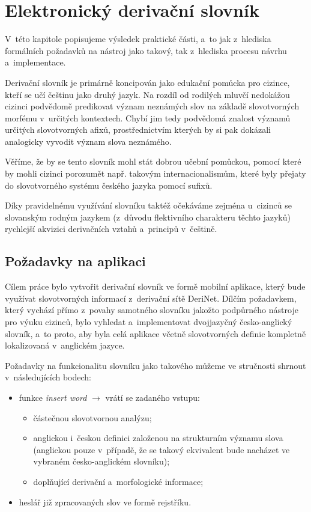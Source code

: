 \hypertarget{elektronickuxfd-derivaux10dnuxed-slovnuxedk}{%
\chapter{Elektronický derivační
slovník}\label{elektronickuxfd-derivaux10dnuxed-slovnuxedk}}

V~této kapitole popisujeme výsledek praktické části, a~to jak z~hlediska
formálních požadavků na nástroj jako takový, tak z~hlediska procesu
návrhu a~implementace.

Derivační slovník je primárně koncipován jako edukační pomůcka pro
cizince, kteří se učí češtinu jako druhý jazyk. Na rozdíl od rodilých
mluvčí nedokážou cizinci podvědomě predikovat význam neznámých slov na
základě slovotvorných morfému v~určitých kontextech. Chybí jim tedy
podvědomá znalost významů určitých slovotvorných afixů, prostřednictvím
kterých by si pak dokázali analogicky vyvodit význam slova neznámého.

Věříme, že by se tento slovník mohl stát dobrou učební pomůckou, pomocí
které by mohli cizinci porozumět např. takovým internacionalismům, které
byly přejaty do slovotvorného systému českého jazyka pomocí sufixů.

Díky pravidelnému využívání slovníku taktéž očekáváme zejména u~cizinců
se slovanským rodným jazykem (z~důvodu flektivního charakteru těchto
jazyků) rychlejší akvizici derivačních vztahů a~principů v~češtině.

\hypertarget{poux17eadavky-na-aplikaci}{%
\section{Požadavky na aplikaci}\label{poux17eadavky-na-aplikaci}}

Cílem práce bylo vytvořit derivační slovník ve formě mobilní aplikace,
který bude využívat slovotvorných informací z~derivační sítě DeriNet.
Dílčím požadavkem, který vychází přímo z~povahy samotného slovníku
jakožto podpůrného nástroje pro výuku cizinců, bylo vyhledat
a~implementovat dvojjazyčný česko-anglický slovník, a~to proto, aby byla
celá aplikace včetně slovotvorných definic kompletně lokalizovaná
v~anglickém jazyce.

Požadavky na funkcionalitu slovníku jako takového můžeme ve stručnosti
shrnout v~následujících bodech:

\begin{itemize}
\tightlist
\item
  funkce \emph{insert word} $\rightarrow$ vrátí se zadaného vstupu:

  \begin{itemize}
  \tightlist
  \item
    částečnou slovotvornou analýzu;
  \item
    anglickou i~českou definici založenou na strukturním významu slova
    (anglickou pouze v~případě, že se takový ekvivalent bude nacházet ve
    vybraném česko-anglickém slovníku);
  \item
    doplňující derivační a~morfologické informace;
  \end{itemize}
\item
  heslář již zpracovaných slov ve formě rejstříku.
\end{itemize}

